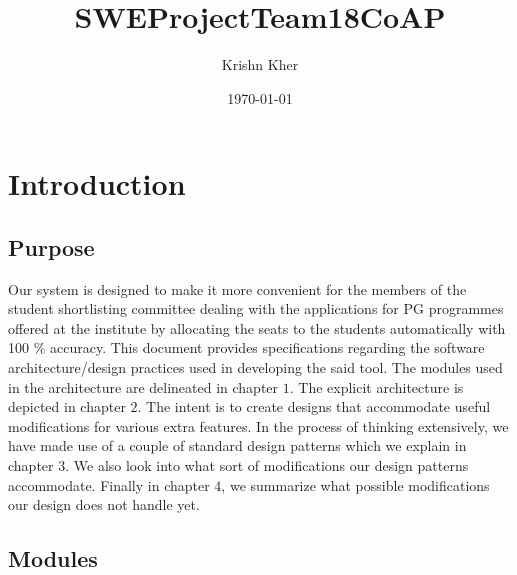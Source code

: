 \documentclass{report}
\title{SWEProjectTeam18CoAP}
\author{Krishn Kher}
\date{\today}
\begin{document}
\setlength{\footskip}{50pt}
\BgThispage

\tableofcontents
\clearpage

\chapter{Introduction}
\section{Purpose}
\begin{tcolorbox}[colframe=white, colback=lightblue, arc=8pt] Our system is designed to make it more convenient for the members of the student shortlisting committee dealing with the applications for PG programmes offered at the institute by allocating the seats to the students automatically with 100 \% accuracy.
This document provides specifications regarding the software architecture/design practices used in developing the said tool. The modules used in the architecture are delineated in chapter $1$.
The explicit architecture is depicted in chapter $2$. The intent is to create designs that accommodate useful modifications for various extra features. In the process of thinking extensively, we have made use of a couple of standard design patterns which we explain in chapter $3$. We also look into what sort of modifications our design patterns accommodate. Finally in chapter $4$, we summarize what possible modifications our design does not handle yet.\end{tcolorbox}

\section{Modules}
\end{document}
